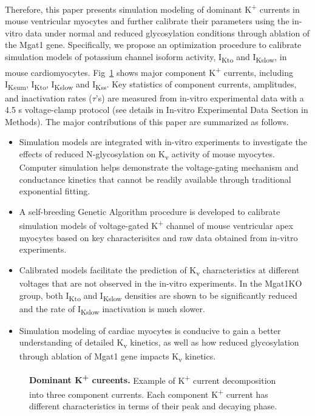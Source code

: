 \documentclass[10pt,letterpaper]{article}
\begin{document}
Therefore, this paper presents simulation modeling of dominant K\textsuperscript{+} currents in mouse ventricular myocytes and further calibrate their parameters using the in-vitro data under normal and reduced glycosylation conditions through ablation of the Mgat1 gene. Specifically, we propose an optimization procedure to calibrate simulation models of potassium channel isoform activity, I\textsubscript{Kto} and I\textsubscript{Kslow}, in mouse cardiomyocytes.  Fig~\ref{fig3} shows  major component K\textsuperscript{+} currents, including I\textsubscript{Ksum}, I\textsubscript{Kto}, I\textsubscript{Kslow} and I\textsubscript{Kss}. Key statistics of component currents, amplitudes, and inactivation rates ($\tau$'s) are measured from in-vitro experimental data with a 4.5 s voltage-clamp protocol (see details in In-vitro Experimental Data Section in Methods). The major contributions of this paper are summarized as follows.
\begin{itemize}
    \item Simulation models are integrated with in-vitro experiments to investigate the effects of reduced N-glycosylation on K\textsubscript{v} activity of mouse myocytes. Computer simulation helps demonstrate the voltage-gating mechanism and conductance kinetics that cannot be readily available through traditional exponential fitting. 
    \item A self-breeding Genetic Algorithm procedure is developed to calibrate simulation models of voltage-gated K\textsuperscript{+} channel of mouse ventricular apex myocytes based on key characterisitcs and raw data obtained from in-vitro experiments.
    \item Calibrated models facilitate the prediction of K\textsubscript{v} characteristics at different voltages that are not observed in the in-vitro experiments. In the Mgat1KO group, both I\textsubscript{Kto} and I\textsubscript{Kslow} densities are shown to be significantly reduced and the rate of I\textsubscript{Kslow} inactivation is much slower.
    \item Simulation modeling of cardiac myocytes is conducive to gain a better understanding of detailed K\textsubscript{v} kinetics, as well as how reduced glycosylation through ablation of Mgat1 gene impacts K\textsubscript{v} kinetics.
\end{itemize}

\begin{figure}[!ht]
    \centering
    \caption{{\bf Dominant K\textsuperscript{+} cureents.} 
    Example of K\textsuperscript{+} current decomposition into three component currents. Each component K\textsuperscript{+} current has different characteristics in terms of their peak and decaying phase.}
    \label{fig3}
\end{figure}
\end{document}
